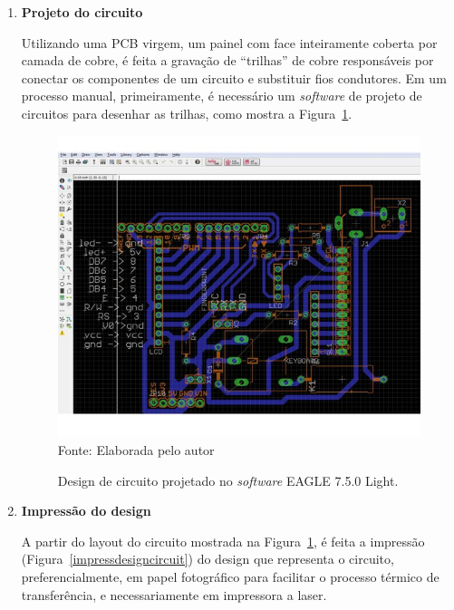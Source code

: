 
\begin{enumerate}

\item \textbf{Projeto do circuito}

  Utilizando uma PCB virgem, um painel com face inteiramente coberta por camada de cobre, é feita a gravação de ``trilhas'' de cobre responsáveis por conectar os componentes de um circuito e substituir fios condutores. Em um processo manual, primeiramente, é necessário um \textit{software} de projeto de circuitos para desenhar as trilhas, como mostra a Figura~\ref{designcircuit}.


  \begin{figure}[ht]
  \begin{center}
  \caption{Design de circuito projetado no \textit{software} EAGLE 7.5.0 Light.}
  \includegraphics[scale=0.8]{figuras/cap2/designcircuit.jpg}\\
  Fonte: Elaborada pelo autor
  \label{designcircuit}
  \end{center}
  \end{figure}

  
  

\item \textbf{Impressão do design}
 
  A partir do layout do circuito mostrada na Figura~\ref{designcircuit}, é feita a impressão (Figura~\ref{impressdesigncircuit}) do design que representa o circuito, preferencialmente, em papel fotográfico para facilitar o processo térmico de transferência, e necessariamente em impressora a laser. 


\end{enumerate}
